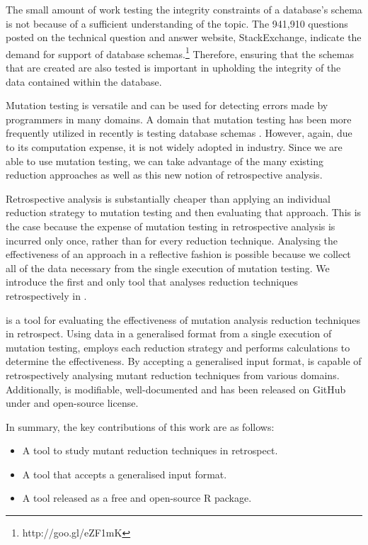 

The small amount of work testing the integrity constraints of a database's schema is not
because of a sufficient understanding of the topic. The 941,910 questions posted on
the technical question and answer website, StackExchange, indicate the demand for support
of database schemas.\footnote{http://goo.gl/eZF1mK} Therefore, ensuring that
the schemas that are created are also tested is important in upholding the integrity
of the data contained within the database.

Mutation testing is versatile and can be used for detecting errors made by programmers in many domains.
A domain that mutation testing has been more frequently utilized in recently is testing database
schemas \cite{mcminn2016virtual, mcminn2015effectiveness, wright2013efficient}. However,
again, due to its computation expense, it is not widely adopted in industry. Since we
are able to use mutation testing, we can take advantage of the many
existing reduction approaches \cite{jia2011analysis, wong1995reducing, offutt1993experimental, offutt2001mutation}
as well as this new notion of retrospective analysis.

Retrospective analysis is substantially cheaper than applying an
individual reduction strategy to mutation testing and then evaluating that
approach. This is the case because the expense of mutation testing in
retrospective analysis is incurred only once, rather than for
every reduction technique. Analysing the effectiveness of an approach in a reflective fashion
is possible because we collect all of the data necessary from
the single execution of mutation testing. We introduce the
first and only tool that analyses reduction techniques retrospectively
in \mr.

\mr is a tool for evaluating the effectiveness of mutation analysis reduction techniques
in retrospect. Using data in a generalised format from a single execution of mutation testing, \mr
employs each reduction strategy and performs calculations to determine the
effectiveness. By accepting a generalised input format, \mr is capable of
retrospectively analysing mutant reduction techniques from various domains.
Additionally, \mr is modifiable, well-documented and has been released on
GitHub under and open-source license.

    In summary, the key contributions of this work are as follows:
    \begin{itemize}
        \item A tool to study mutant reduction techniques in retrospect.
        \item A tool that accepts a generalised input format.
        \item A tool released as a free and open-source R package.
    \end{itemize}
